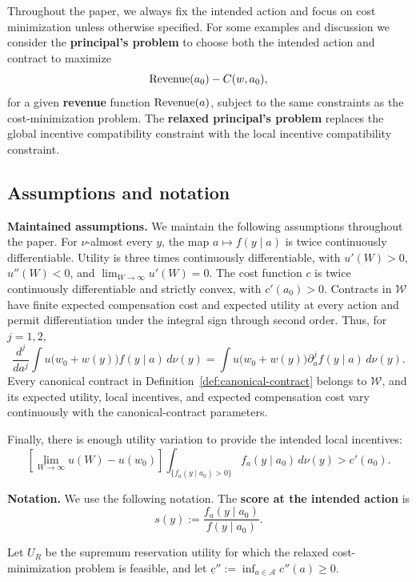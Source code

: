 Throughout the paper, we always fix the intended action and focus on cost minimization unless otherwise specified. For some examples and discussion we consider the \textbf{principal's problem} to choose both the intended action and contract to maximize
\[
    \operatorname{Revenue}(a_0)-C(w,a_0),
\]
for a given \textbf{revenue} function $\operatorname{Revenue}(a)$, subject to the same constraints as the cost-minimization problem. The \textbf{relaxed principal's problem} replaces the global incentive compatibility constraint with the local incentive compatibility constraint.

\subsection{Assumptions and notation}
\textbf{Maintained assumptions.}
We maintain the following assumptions throughout the paper.  For
$\nu$-almost every $y$, the map $a\mapsto f(y\mid a)$ is twice continuously
differentiable.  Utility is three times continuously differentiable, with
$u'(W)>0$, $u''(W)<0$, and $\lim_{W\to\infty}u'(W)=0$.  The cost function $c$
is twice continuously differentiable and strictly convex, with $c'(a_0)>0$.
Contracts in $\mathcal W$ have finite expected compensation cost and expected
utility at every action and permit differentiation under the integral sign
through second order.  Thus, for $j=1,2$,
\begin{equation}
    \frac{d^j}{da^j}\int
    u\bigl(w_0+w(y)\bigr)f(y\mid a)\,d\nu(y)
    =
    \int u\bigl(w_0+w(y)\bigr)
    \partial_a^j f(y\mid a)\,d\nu(y).
    \label{eq:contract-differentiation}
\end{equation}
Every canonical contract in Definition~\ref{def:canonical-contract} belongs to $\mathcal W$, and its
expected utility, local incentives, and expected compensation cost vary
continuously with the canonical-contract parameters.

Finally, there is enough utility variation to provide the intended local
incentives:
\begin{equation}
    \left[\lim_{W\to\infty}u(W)-u(w_0)\right]
    \int_{\{f_a(y\mid a_0)>0\}}f_a(y\mid a_0)\,d\nu(y)
    >c'(a_0).
    \label{eq:local-implementability}
\end{equation}

\textbf{Notation.}
We use the following notation.  The \textbf{score at the intended action} is
\[
    s(y):=\frac{f_a(y\mid a_0)}{f(y\mid a_0)}.
\]

Let $U_R$ be the supremum reservation utility for which the relaxed
cost-minimization problem is feasible, and let
$\underline c'' := \inf_{a\in\mathcal A}c''(a)\geq0$.

